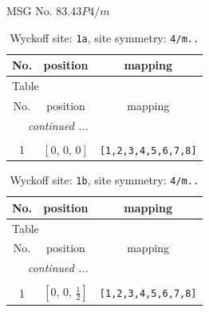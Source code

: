 \documentclass[fleqn,8pt]{jsarticle}
\begin{document}
\setcounter{MaxMatrixCols}{32}

\renewcommand{\tablename}{Table~}
\renewcommand{\figurename}{Figure~}
\begin{center}
\LARGE
MSG No. 83.43\quad$P4/m$
\end{center}
\renewcommand{\arraystretch}{1.2}
\begin{longtable}{ccc}
\caption{Wyckoff site: {\tt 1a}, site symmetry: {\tt 4/m..}}
 \\
 \hline \hline
No. & position & mapping \\ \hline \endfirsthead

\multicolumn{2}{l}{\tablename\ \thetable{}} \\
 \hline \hline
No. & position & mapping \\ \hline \endhead

 \hline \hline
\multicolumn{2}{r}{\footnotesize\it continued ...} \\ \endfoot

 \hline \hline
\multicolumn{2}{r}{} \\ \endlastfoot

1 & $\left[ 0,\, 0,\, 0 \right]$ & {\tt [1,2,3,4,5,6,7,8]} \\
\end{longtable}
\renewcommand{\arraystretch}{1.2}
\begin{longtable}{ccc}
\caption{Wyckoff site: {\tt 1b}, site symmetry: {\tt 4/m..}}
 \\
 \hline \hline
No. & position & mapping \\ \hline \endfirsthead

\multicolumn{2}{l}{\tablename\ \thetable{}} \\
 \hline \hline
No. & position & mapping \\ \hline \endhead

 \hline \hline
\multicolumn{2}{r}{\footnotesize\it continued ...} \\ \endfoot

 \hline \hline
\multicolumn{2}{r}{} \\ \endlastfoot

1 & $\left[ 0,\, 0,\, \frac{1}{2} \right]$ & {\tt [1,2,3,4,5,6,7,8]} \\
\end{longtable}
\renewcommand{\arraystretch}{1.2}
\end{document}
